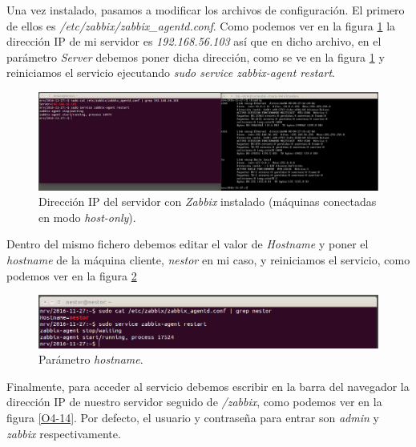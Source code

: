 \documentclass[a4paper,titlepage,12pt]{scrartcl}	%
\numberwithin{figure}{section} %
\numberwithin{table}{section} %
\begin{document}
	Una vez instalado, pasamos a modificar los archivos de configuración. El primero de ellos es \textit{/etc/zabbix/zabbix\_agentd.conf}. Como podemos ver en la figura \ref{O4-12} la dirección IP de mi servidor es \textit{192.168.56.103} así que en dicho archivo, en el parámetro \textit{Server} debemos poner dicha dirección, como se ve en la figura \ref{O4-12} y reiniciamos el servicio ejecutando \textit{sudo service zabbix-agent restart}.
	
	\begin{figure}[H]
		\includegraphics[width=\linewidth]{./Imagenes/O4-12.png}
		\vspace{-0.5cm}
		\caption[Dirección IP del servidor con \textit{Zabbix} instalado (máquinas conectadas en modo \textit{host-only}).]{Dirección IP del servidor con \textit{Zabbix} instalado (máquinas conectadas en modo \textit{host-only}).}
		\label{O4-12}
	\end{figure}
	
	Dentro del mismo fichero debemos editar el valor de \textit{Hostname} y poner el \textit{hostname} de la máquina cliente, \textit{nestor} en mi caso, y reiniciamos el servicio, como podemos ver en la figura \ref{O4-13}
	
	\begin{figure}[H]
		\includegraphics[width=\linewidth]{./Imagenes/O4-13.png}
		\vspace{-0.5cm}
		\caption[Parámetro \textit{hostname}.]{Parámetro \textit{hostname}.}
		\label{O4-13}
	\end{figure}
	
	Finalmente, para acceder al servicio debemos escribir en la barra del navegador la dirección IP de nuestro servidor seguido de \textit{/zabbix}, como podemos ver en la figura \ref{O4-14}. Por defecto, el usuario y contraseña para entrar son \textit{admin} y \textit{zabbix} respectivamente.
	
\end{document}

